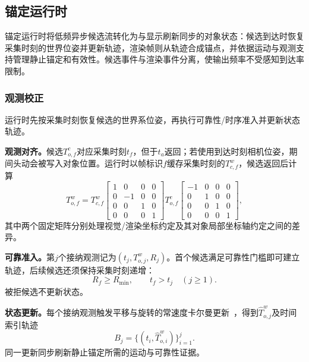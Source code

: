\documentclass[review]{vgtc}
\begin{document}
\subsection{锚定运行时}\label{sec:anchoring}

锚定运行时将低频异步候选流转化为与显示刷新同步的对象状态：候选到达时恢复采集时刻的世界位姿并更新轨迹，渲染帧则从轨迹合成锚点，并依据运动与观测支持管理静止锚定和有效性。候选事件与渲染事件分离，使输出频率不受感知到达率限制。

\subsubsection{观测校正}\label{sec:obs-update}

运行时先按采集时刻恢复候选的世界系位姿，再执行可靠性/时序准入并更新状态轨迹。

\textbf{观测对齐。}候选$T_{o,f}^{c}$对应采集时刻$t_f$，但于$t_a$返回；若使用到达时刻相机位姿，期间头动会被写入对象位置。运行时以帧标识$f$缓存采集时刻的$T_{c,f}^{w}$，候选返回后计算
\begin{equation}
T_{o,f}^{w} = T_{c,f}^{w}
\begin{bmatrix}
1 & 0 & 0 & 0 \\
0 & -1 & 0 & 0 \\
0 & 0 & 1 & 0 \\
0 & 0 & 0 & 1
\end{bmatrix}
T_{o,f}^{c}
\begin{bmatrix}
-1 & 0 & 0 & 0 \\
0 & 1 & 0 & 0 \\
0 & 0 & 1 & 0 \\
0 & 0 & 0 & 1
\end{bmatrix},
\label{eq:capture-alignment}
\end{equation}
其中两个固定矩阵分别处理视觉/渲染坐标约定及其对象局部坐标轴约定之间的差异。

\textbf{可靠准入。}第$j$个接纳观测记为$(t_j,T_{o,j}^{w},R_j)$。首个候选满足可靠性门槛即可建立轨迹，后续候选还须保持采集时刻递增：
\begin{equation}
R_f \geq R_{\min}, \qquad t_f > t_j \quad (j \geq 1).
\label{eq:admission}
\end{equation}
被拒候选不更新状态。

\textbf{状态更新。}每个接纳观测触发平移与旋转的常速度卡尔曼更新~\cite{kalman1960new}，得到$\widehat{T}_{o,j}^{w}$及时间索引轨迹
\begin{equation}
B_j = \{(t_i, \widehat{T}_{o,i}^{w})\}_{i=1}^{j}.
\label{eq:trajectory}
\end{equation}
同一更新同步刷新静止锚定所需的运动与可靠性证据。
\end{document}
